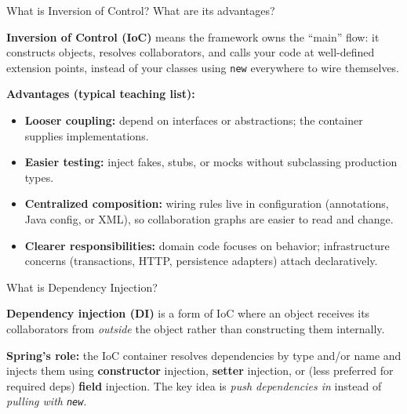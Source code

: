 




\question[4]
What is Inversion of Control? What are its advantages?
\begin{solutionorbox}[1.45in]
  \textbf{Inversion of Control (IoC)} means the framework owns the ``main'' flow: it constructs objects, resolves collaborators, and calls your code at well-defined extension points, instead of your classes using \texttt{new} everywhere to wire themselves.

  \noindent\textbf{Advantages (typical teaching list):}
  \begin{itemize}
    \item \textbf{Looser coupling:} depend on interfaces or abstractions; the container supplies implementations.
    \item \textbf{Easier testing:} inject fakes, stubs, or mocks without subclassing production types.
    \item \textbf{Centralized composition:} wiring rules live in configuration (annotations, Java config, or XML), so collaboration graphs are easier to read and change.
    \item \textbf{Clearer responsibilities:} domain code focuses on behavior; infrastructure concerns (transactions, HTTP, persistence adapters) attach declaratively.
  \end{itemize}
\end{solutionorbox}

\question[4]
What is Dependency Injection?
\begin{solutionorbox}[1.2in]
  \textbf{Dependency injection (DI)} is a form of IoC where an object receives its collaborators from \emph{outside} the object rather than constructing them internally.

  \noindent\textbf{Spring's role:} the IoC container resolves dependencies by type and/or name and injects them using \textbf{constructor} injection, \textbf{setter} injection, or (less preferred for required deps) \textbf{field} injection. The key idea is \emph{push dependencies in} instead of \emph{pulling with \texttt{new}}.
\end{solutionorbox}

